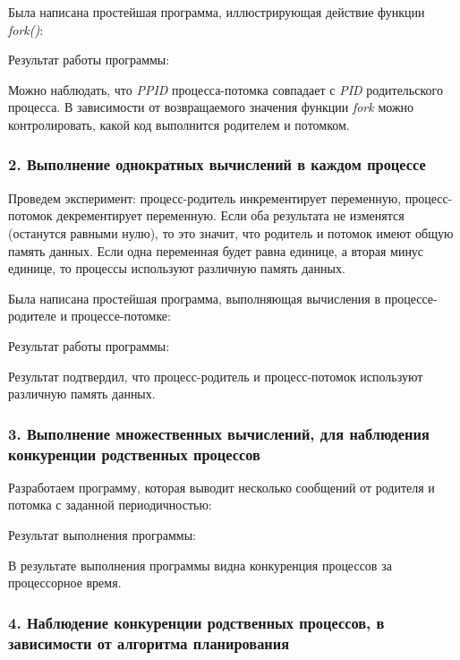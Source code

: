 \documentclass[14pt,a4paper,report]{report}
\begin{document}
Была написана простейшая программа, иллюстрирующая действие функции \emph{fork()}:



Результат работы программы:



Можно наблюдать, что \emph{PPID} процесса-потомка совпадает с \emph{PID} родительского процесса. В зависимости от возвращаемого значения функции \emph{fork} можно контролировать, какой код выполнится родителем и потомком.

\subsubsection{2. Выполнение однократных вычислений в каждом процессе}

Проведем эксперимент: процесс-родитель инкрементирует переменную, процесс-потомок декрементирует переменную. Если оба результата не изменятся (останутся равными нулю), то это значит, что родитель и потомок имеют общую память данных. Если одна переменная будет равна единице, а вторая минус единице, то процессы используют различную память данных.

Была написана простейшая программа, выполняющая вычисления в процессе-родителе и процессе-потомке:



Результат работы программы:



Результат подтвердил, что процесс-родитель и процесс-потомок используют различную память данных.

\subsubsection{3. Выполнение множественных вычислений, для наблюдения конкуренции родственных процессов}

Разработаем программу, которая выводит несколько сообщений от родителя и потомка с заданной периодичностью:



Результат выполнения программы:



В результате выполнения программы видна конкуренция процессов за процессорное время.

\subsubsection{4. Наблюдение конкуренции родственных процессов, в зависимости от алгоритма планирования}
\end{document}
